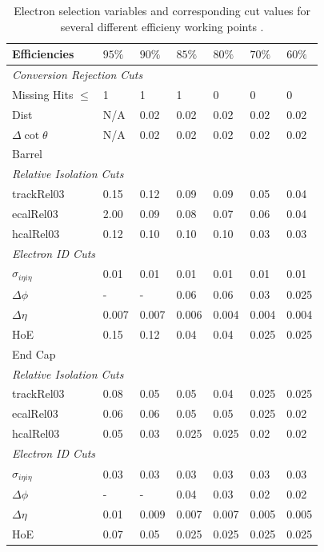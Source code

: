 \begin{table}[htbp]
  \begin{center}
    \begin{tabular}{lllllll} 
\toprule
Efficiencies& $95\%$& $90\%$& $85\%$& $80\%$& $70\%$& $60\%$\\
\midrule
\multicolumn{7}{l}{\emph{Conversion Rejection Cuts}}\\ 
Missing Hits $\leq$& 1& 1& 1& 0& 0& 0\\
Dist& N/A& 0.02& 0.02& 0.02& 0.02& 0.02\\
$\Delta\cot\theta$& N/A& 0.02& 0.02& 0.02& 0.02& 0.02\\
\midrule
\multicolumn{7}{l}{Barrel}\\ 
\multicolumn{7}{l}{\emph{Relative Isolation Cuts}} \\
trackRel03& 0.15& 0.12& 0.09& 0.09& 0.05& 0.04\\
ecalRel03& 2.00& 0.09& 0.08& 0.07& 0.06& 0.04\\
hcalRel03& 0.12& 0.10& 0.10& 0.10& 0.03& 0.03\\
\multicolumn{7}{l}{\emph{Electron ID Cuts}} \\
$\sigma_{i\eta i\eta}$& 0.01& 0.01& 0.01& 0.01& 0.01& 0.01\\
$\Delta \phi$& - & - & 0.06& 0.06& 0.03& 0.025\\
$\Delta \eta$& 0.007& 0.007& 0.006& 0.004& 0.004& 0.004\\
HoE& 0.15& 0.12& 0.04& 0.04& 0.025& 0.025\\
\midrule
\multicolumn{7}{l}{End Cap}\\ 
\multicolumn{7}{l}{\emph{Relative Isolation Cuts}} \\
trackRel03& 0.08& 0.05& 0.05& 0.04& 0.025& 0.025\\
ecalRel03& 0.06& 0.06& 0.05& 0.05& 0.025& 0.02\\
hcalRel03& 0.05& 0.03& 0.025& 0.025& 0.02& 0.02\\
\multicolumn{7}{l}{\emph{Electron ID Cuts}} \\
$\sigma_{i\eta i\eta}$& 0.03& 0.03& 0.03& 0.03& 0.03& 0.03\\
$\Delta \phi$& - & - & 0.04& 0.03& 0.02& 0.02\\
$\Delta \eta$& 0.01& 0.009& 0.007& 0.007& 0.005& 0.005\\
HoE& 0.07& 0.05& 0.025& 0.025& 0.025& 0.025\\
\bottomrule
    \end{tabular}
    \caption{Electron selection variables and
corresponding cut values for several different efficieny working points
\cite{nikos}.}
  \end{center}
\label{tab:electronwp} 
\end{table}


